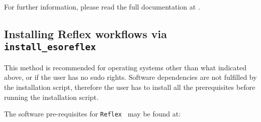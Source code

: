  For further information, please read the full documentation at \newline
 .
 


\subsection{Installing Reflex workflows via \texorpdfstring{{\tt install\_esoreflex}}{install\_esoreflex}}

This method is recommended for operating systems other than what
indicated above, or if the user has no sudo rights. Software
dependencies are not fulfilled by the installation script, therefore
the user has to install all the prerequisites before running the
installation script.

The software pre-requisites for {\tt Reflex } may be found at:\newline

